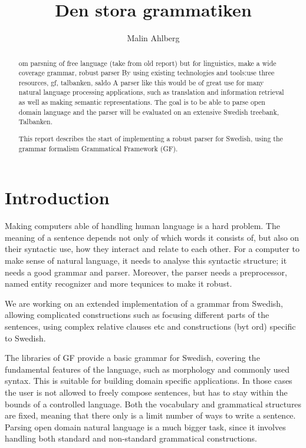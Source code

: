 \documentclass[submission,copyright,creativecommons]{eptcs} %
\title{Den stora grammatiken} %
\author{Malin Ahlberg
\institute{Gothenburg University, Sweden}
\email{ahlberg.malin@gmail.com}
}
\begin{document}
\maketitle


\begin{abstract}
om parsning of free language (take from old report)
but for linguistics, make a wide coverage grammar, robust parser
By using existing technologies
and tools:use three resources, gf, talbanken, saldo
A parser like this would be of great use for many natural
language processing applications, such as translation and information retrieval
as well as making semantic representations.
The goal is to be able to parse open domain language and the
parser will be evaluated on an extensive Swedish
treebank, Talbanken. 

This report describes the start of implementing a robust parser for Swedish,
using the grammar formalism Grammatical Framework\cite{gf} (GF).

\end{abstract}

\section{Introduction}

Making computers able of handling human language is a 
hard problem.
The meaning of a sentence depends not only of which words it consists of, but
also on their syntactic use, how they interact and relate to each other.
For a computer to make sense of natural language, it needs to analyse this 
syntactic structure; it needs a good grammar and parser.
Moreover, the parser needs a preprocessor, named entity recognizer and more
tequnices to make it robust. 

We are working on an extended implementation of a grammar from Swedish, allowing
complicated constructions such as focusing different parts of the sentences,
using complex relative clauses etc and constructions (byt ord) specific to Swedish.

The libraries of GF provide a basic grammar for
Swedish, covering the fundamental features of the language, such as morphology and
commonly used syntax. This is suitable 
for building domain specific applications. In those cases the user is not
allowed to freely compose sentences, but has to stay within the bounds of a 
controlled language. Both the vocabulary and grammatical structures are fixed,
meaning that there only is a limit number of ways to write a sentence.
Parsing open domain natural language is a much bigger task, since it involves handling both
standard and non-standard grammatical constructions. 
\end{document}
